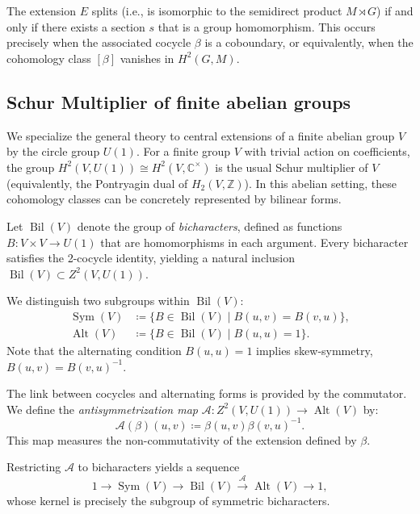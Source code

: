 \documentclass[11pt, reqno]{amsart}
\theoremstyle{definition}
\theoremstyle{remark}
\newcommand{\Z}{\mathbb{Z}}
\newcommand{\C}{\mathbb{C}}
\DeclareMathOperator{\Alt}{Alt}
\DeclareMathOperator{\Sym}{Sym}
\DeclareMathOperator{\Bil}{Bil}
\begin{document}
The extension $E$ splits (i.e., is isomorphic to the semidirect product $M \rtimes G$) if and only if there exists a section $s$ that is a group homomorphism. This occurs precisely when the associated cocycle $\beta$ is a coboundary, or equivalently, when the cohomology class $[\beta]$ vanishes in $H^2(G, M)$.



\subsection{Schur Multiplier of finite abelian groups}

We specialize the general theory to central extensions of a finite abelian group $V$ by the circle group $U(1)$. For a finite group $V$ with trivial action on coefficients, the group $H^2(V, U(1)) \cong H^2(V, \C^\times)$ is the usual Schur multiplier of $V$ (equivalently, the Pontryagin dual of $H_2(V,\Z)$). In this abelian setting, these cohomology classes can be concretely represented by bilinear forms.

Let $\Bil(V)$ denote the group of \emph{bicharacters}, defined as functions $B: V \times V \to U(1)$ that are homomorphisms in each argument. Every bicharacter satisfies the 2-cocycle identity, yielding a natural inclusion $\Bil(V) \subset Z^2(V, U(1))$.

We distinguish two subgroups within $\Bil(V)$:
\begin{align}
\Sym(V) &\coloneqq \{ B \in \Bil(V) \mid B(u, v) = B(v, u) \}, \\
\Alt(V) &\coloneqq \{ B \in \Bil(V) \mid B(u, u) = 1 \}.
\end{align}
Note that the alternating condition $B(u, u) = 1$ implies skew-symmetry, $B(u, v) = B(v, u)^{-1}$.

The link between cocycles and alternating forms is provided by the commutator. We define the \emph{antisymmetrization map} $\mathcal{A}: Z^2(V, U(1)) \to \Alt(V)$ by:
\begin{equation}
\mathcal{A}(\beta)(u, v) \coloneqq \beta(u, v)\beta(v, u)^{-1}.
\end{equation}
This map measures the non-commutativity of the extension defined by $\beta$.

Restricting $\mathcal{A}$ to bicharacters yields a sequence
\begin{equation}\label{eq:bil-sym-alt}
1 \longrightarrow \Sym(V) \longrightarrow \Bil(V) \xrightarrow{\;\mathcal{A}\;} \Alt(V) \longrightarrow 1,
\end{equation}
whose kernel is precisely the subgroup of symmetric bicharacters. 
\end{document}
